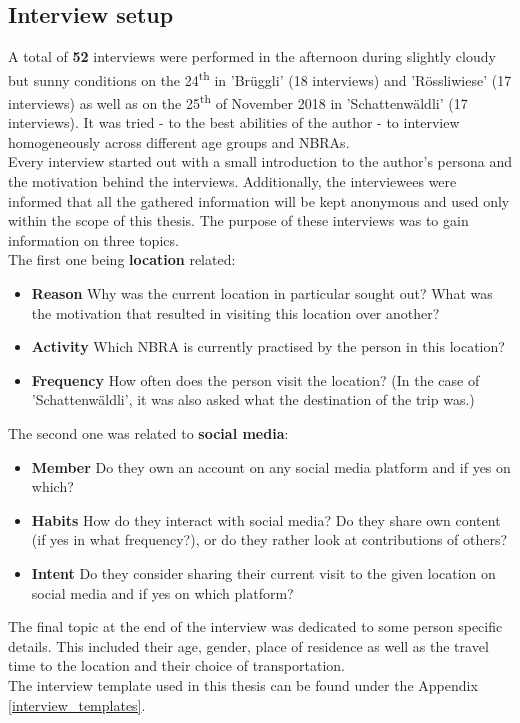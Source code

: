 \subsection{Interview setup} \label{interview_setup}
A total of \textbf{52} interviews were performed in the afternoon during slightly cloudy but sunny conditions on the 24\textsuperscript{th} in 'Br\"uggli' (18 interviews) and 'R\"ossliwiese' (17 interviews) as well as on the 25\textsuperscript{th} of November 2018 in 'Schattenw\"aldli' (17 interviews). It was tried - to the best abilities of the author - to interview homogeneously across different age groups and NBRAs.\\
Every interview started out with a small introduction to the author's persona and the motivation behind the interviews. Additionally, the interviewees were informed that all the gathered information will be kept anonymous and used only within the scope of this thesis. The purpose of these interviews was to gain information on three topics.\\
\newline
The first one being \textbf{location} related:
\begin{itemize}[label={}]
    \item \textbf{Reason} Why was the current location in particular sought out? What was the motivation that resulted in visiting this location over another?
    \item \textbf{Activity} Which NBRA is currently practised by the person in this location?
    \item \textbf{Frequency} How often does the person visit the location? (In the case of 'Schattenw\"aldli', it was also asked what the destination of the trip was.)
\end{itemize}

The second one was related to \textbf{social media}:
\begin{itemize}[label={}]
    \item \textbf{Member} Do they own an account on any social media platform and if yes on which?
    \item \textbf{Habits} How do they interact with social media? Do they share own content (if yes in what frequency?), or do they rather look at contributions of others?
    \item \textbf{Intent} Do they consider sharing their current visit to the given location on social media and if yes on which platform?
\end{itemize}
The final topic at the end of the interview was dedicated to some person specific details. This included their age, gender, place of residence as well as the travel time to the location and their choice of transportation.\\
The interview template used in this thesis can be found under the Appendix \ref{interview_templates}.
















